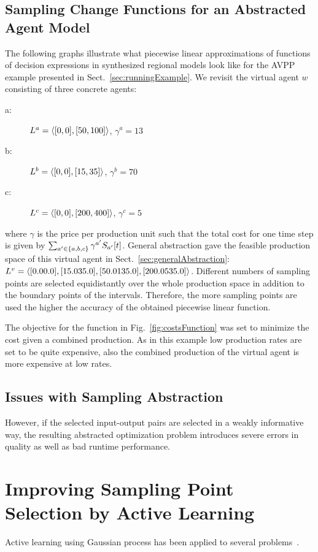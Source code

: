\documentclass[conference]{IEEEtran}
\newcommand{\sref}[1]{Sect.~\ref{#1}}
\newcommand{\fref}[1]{Fig.~\ref{#1}}
\begin{document}
\subsection{Sampling Change Functions for an Abstracted Agent Model}
The following graphs illustrate what piecewise linear approximations of functions of decision expressions in synthesized regional models look like for the AVPP example presented in \sref{sec:runningExample}. We revisit the virtual agent $w$ consisting of three concrete agents:
%
\begin{description}
\item[a:] $\ListSym^a = \langle [0,0], [50, 100] \rangle$, $\gamma^a = 13$
\item[b:] $\ListSym^b = \langle [0,0], [15, 35] \rangle$, $\gamma^b = 70$
\item[c:] $\ListSym^c = \langle [0,0], [200, 400] \rangle$, $\gamma^c = 5$
\end{description}
where $\gamma$ is the price per production unit such that the total cost for one time step is given by $\sum_{a' \in \{a,b,c\}} \gamma^{a'} \AgentPower{t}{a'}$. General abstraction gave the feasible production space of this virtual agent in \sref{sec:generalAbstraction}: $\ListSym^v = \langle [0.0 0.0], [15.0 35.0], [50.0 135.0], [200.0 535.0] \rangle$. Different numbers of sampling points are selected equidistantly over the whole production space in addition to the boundary points of the intervals. Therefore, the more sampling points are used the higher the accuracy of the obtained piecewise linear function.


The objective for the function in \fref{fig:costsFunction} was set to minimize the cost given a combined production. As in this example low production rates are set to be quite expensive, also the combined production of the virtual agent is more expensive at low rates.

\subsection{Issues with Sampling Abstraction}
However, if
the selected input-output pairs are selected in a weakly informative way, the resulting abstracted
optimization problem introduces severe errors in quality as well as bad runtime performance.


\section{Improving Sampling Point Selection by Active Learning}
Active learning using Gaussian process has been applied to several problems~\cite{Krause2007,Krause2008,Park2011}. 
\end{document}

